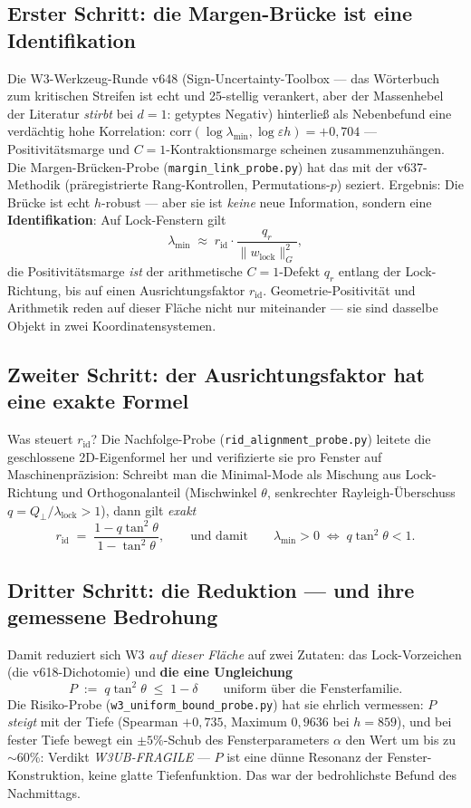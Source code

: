 \documentclass[11pt,a4paper]{article}
\begin{document}
\subsection*{Erster Schritt: die Margen-Brücke ist eine
Identifikation}

Die W3-Werkzeug-Runde v648 (Sign-Uncertainty-Toolbox --- das
Wörterbuch zum kritischen Streifen ist echt und 25-stellig
verankert, aber der Massenhebel der Literatur \emph{stirbt} bei
$d = 1$: getyptes Negativ) hinterließ als Nebenbefund eine
verdächtig hohe Korrelation: $\mathrm{corr}(\log \lambda_{\min},
\log \varepsilon h) = +0{,}704$ --- Positivitätsmarge und
$C = 1$-Kontraktionsmarge scheinen zusammenzuhängen. Die
Margen-Brücken-Probe (\texttt{margin\_link\_probe.py}) hat das mit
der v637-Methodik (präregistrierte Rang-Kontrollen,
Permutations-$p$) seziert. Ergebnis: Die Brücke ist echt
$h$-robust --- aber sie ist \emph{keine} neue Information, sondern
eine \textbf{Identifikation}: Auf Lock-Fenstern gilt
\[
\lambda_{\min} \;\approx\; r_{\mathrm{id}} \cdot
\frac{q_r}{\|w_{\mathrm{lock}}\|_G^2},
\]
die Positivitätsmarge \emph{ist} der arithmetische
$C = 1$-Defekt $q_r$ entlang der Lock-Richtung, bis auf einen
Ausrichtungsfaktor $r_{\mathrm{id}}$. Geometrie-Positivität und
Arithmetik reden auf dieser Fläche nicht nur miteinander --- sie
sind dasselbe Objekt in zwei Koordinatensystemen.

\subsection*{Zweiter Schritt: der Ausrichtungsfaktor hat eine exakte
Formel}

Was steuert $r_{\mathrm{id}}$? Die Nachfolge-Probe
(\texttt{rid\_alignment\_probe.py}) leitete die geschlossene
2D-Eigenformel her und verifizierte sie pro Fenster auf
Maschinenpräzision: Schreibt man die Minimal-Mode als Mischung aus
Lock-Richtung und Orthogonalanteil (Mischwinkel $\theta$,
senkrechter Rayleigh-Überschuss $q = Q_\perp/\lambda_{\mathrm{lock}}
> 1$), dann gilt \emph{exakt}
\[
r_{\mathrm{id}} \;=\; \frac{1 - q \tan^2\theta}{1 - \tan^2\theta},
\qquad\text{und damit}\qquad
\lambda_{\min} > 0 \;\Longleftrightarrow\; q \tan^2\theta < 1 .
\]

\subsection*{Dritter Schritt: die Reduktion --- und ihre gemessene
Bedrohung}

Damit reduziert sich W3 \emph{auf dieser Fläche} auf zwei Zutaten:
das Lock-Vorzeichen (die v618-Dichotomie) und \textbf{die eine
Ungleichung}
\[
P \;:=\; q \tan^2\theta \;\le\; 1 - \delta
\qquad\text{uniform über die Fensterfamilie.}
\]
Die Risiko-Probe (\texttt{w3\_uniform\_bound\_probe.py}) hat sie
ehrlich vermessen: $P$ \emph{steigt} mit der Tiefe (Spearman
$+0{,}735$, Maximum $0{,}9636$ bei $h = 859$), und bei fester Tiefe
bewegt ein $\pm 5\%$-Schub des Fensterparameters $\alpha$ den Wert
um bis zu $\sim$60\%: Verdikt \emph{W3UB-FRAGILE} --- $P$ ist eine
dünne Resonanz der Fenster-Konstruktion, keine glatte
Tiefenfunktion. Das war der bedrohlichste Befund des Nachmittags.
\end{document}
